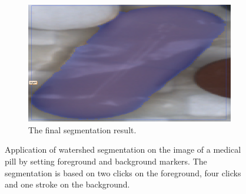 \begin{figure}
\begin{subfigure}[t]{0.45\textwidth}
		\centering
		\includegraphics[width=\textwidth]{figures/chap32_watershed_application6.png}
		\caption{
			The final segmentation result.\newline	
		} \label{fig:ch3:sec3:application6}
	\end{subfigure}
	\caption [Watershed User Interaction]{
		Application of watershed segmentation on the image of a medical pill by setting foreground and background markers.
		The segmentation is based on two clicks on the foreground, four clicks and one stroke on the background.
	} \label{fig:ch3:sec2:application}
\end{figure}